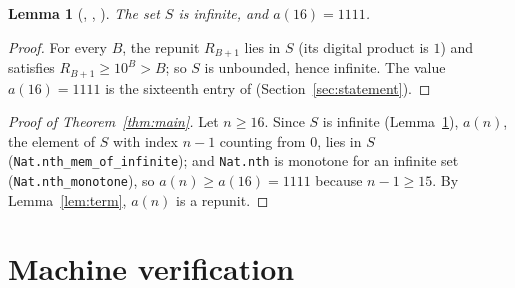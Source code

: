 \documentclass[11pt]{amsart}
\theoremstyle{plain}
\newtheorem{lemma}[theorem]{Lemma}
\theoremstyle{definition}
\begin{document}
\begin{lemma}[, , ]\label{lem:seq}
The set $S$ is infinite, and $a(16)=1111$.
\end{lemma}

\begin{proof}
For every $B$, the repunit $R_{B+1}$ lies in $S$ (its digital product is $1$) and satisfies $R_{B+1}\ge10^B>B$; so $S$ is unbounded, hence infinite. The value $a(16)=1111$ is the sixteenth entry of  (Section~\ref{sec:statement}).
\end{proof}

\begin{proof}[Proof of Theorem~\ref{thm:main}]
Let $n\ge16$. Since $S$ is infinite (Lemma~\ref{lem:seq}), $a(n)$, the element of $S$ with index $n-1$ counting from $0$, lies in $S$ (\texttt{Nat.nth\_mem\_of\_infinite}); and \texttt{Nat.nth} is monotone for an infinite set (\texttt{Nat.nth\_monotone}), so $a(n)\ge a(16)=1111$ because $n-1\ge15$. By Lemma~\ref{lem:term}, $a(n)$ is a repunit.
\end{proof}

\section{Machine verification}\label{sec:lean}
\end{document}
